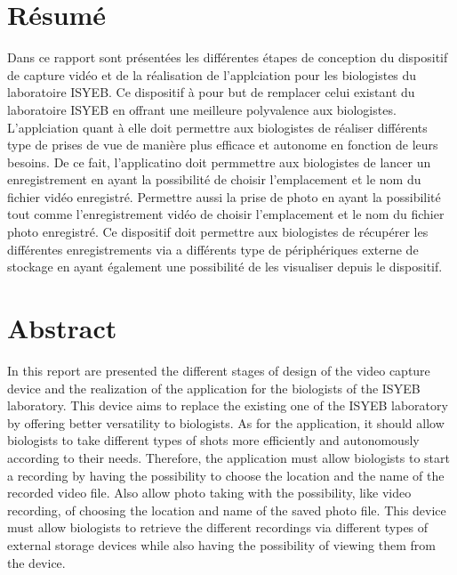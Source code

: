 \vspace*{\fill}
    \section*{Résumé}
        Dans ce rapport sont présentées les différentes étapes de conception du dispositif de capture vidéo et de la réalisation de l'applciation pour les biologistes du laboratoire ISYEB.
        Ce dispositif à pour but de remplacer celui existant du laboratoire ISYEB en offrant une meilleure polyvalence aux biologistes.
        L'applciation quant à elle doit permettre aux biologistes de réaliser différents type de prises de vue de manière plus efficace et autonome en fonction de leurs besoins.
        De ce fait, l'applicatino doit permmettre aux biologistes de lancer un enregistrement en ayant la possibilité de choisir l'emplacement et le nom du fichier vidéo enregistré. Permettre aussi la prise  de photo en ayant la possibilité tout comme l'enregistrement vidéo de choisir l'emplacement et le nom du fichier photo enregistré.
        Ce dispositif doit permettre aux biologistes de récupérer les différentes enregistrements via a différents type de périphériques externe de stockage en ayant également une possibilité de les visualiser depuis le dispositif.

    \section*{Abstract}
        In this report are presented the different stages of design of the video capture device and the realization of the application for the biologists of the ISYEB laboratory.
        This device aims to replace the existing one of the ISYEB laboratory by offering better versatility to biologists.
        As for the application, it should allow biologists to take different types of shots more efficiently and autonomously according to their needs.
        Therefore, the application must allow biologists to start a recording by having the possibility to choose the location and the name of the recorded video file. Also allow photo taking with the possibility, like video recording, of choosing the location and name of the saved photo file.
        This device must allow biologists to retrieve the different recordings via different types of external storage devices while also having the possibility of viewing them from the device.

\vspace*{\fill}